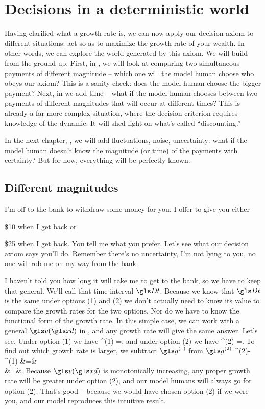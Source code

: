 \section{Decisions in a deterministic world}
Having clarified what a growth rate is, we can now apply our decision axiom to different situations: act so as to maximize the growth rate of your wealth. In other words, we can explore the world generated by this axiom. We will build from the ground up. First, in , we will look at comparing two simultaneous payments of different magnitude -- which one will the model human choose who obeys our axiom? This is a sanity check: does the model human choose the bigger payment? Next, in  we add time -- what if the model human chooses between two payments of different magnitudes that will occur at different times? This is already a far more complex situation, where the decision criterion requires knowledge of the dynamic. It will shed light on what's called ``discounting.'' 

In the next chapter, , we will add fluctuations, noise, uncertainty: what if the model human doesn't know the magnitude (or time) of the payments with certainty? But for now, everything will be perfectly known.

\subsection{Different magnitudes}
I'm off to the bank to withdraw some money for you. I offer to give you either
\bi
\item[(1)] \$10 when I 
get back or 
\item[(2)] \$25 when I get back. You tell me what you prefer.
\ei
Let's see what our decision axiom says you'll do. Remember there's no uncertainty, I'm not lying to you, no one will rob me on my way from the bank \etc

I haven't told you how long it will take me to get to the bank, so we have to keep that general. We'll call that time interval $\Dt$.
Because we know that $\Dt$ is the same under options (1) and (2) we don't actually need to know its value to compare the growth rates for the two options. 
Nor do we have to know the functional form of the growth rate. In this simple case, we can work with a general $\gv(\xd)$ in , and any growth rate will give the same answer. Let's see.
Under option (1) we have
\be
\g^{(1)} =,
\ee
and under option (2) we have
\be
\g^{(2)} =.
\ee
To find out which growth rate is larger, we subtract $\g^{(1)}$ from $\g^{(2)}$ 
\bea
\g^{(2)}-\g^{(1)} &=&\\
 &=&.
\eea
Because $\gv(\xd)$ is monotonically increasing, any proper growth rate will be greater under option (2), and 
our model humans will always go for option (2). That's good -- because we would have chosen option (2) if we were you, and 
our model reproduces this intuitive result.


